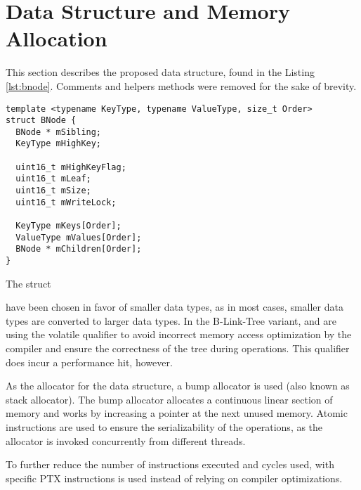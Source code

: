 \section{Data Structure and Memory Allocation}

This section describes the proposed data structure, found in the Listing \ref{lst:bnode}. Comments and helpers methods were removed for the sake of brevity.

\begin{listing}[H]
  \begin{verbatim}
template <typename KeyType, typename ValueType, size_t Order>
struct BNode {
  BNode * mSibling;
  KeyType mHighKey;

  uint16_t mHighKeyFlag;
  uint16_t mLeaf;
  uint16_t mSize;
  uint16_t mWriteLock;

  KeyType mKeys[Order];
  ValueType mValues[Order];
  BNode * mChildren[Order]; 
}
    \end{verbatim}
  \caption{The  struct}\label{lst:bnode}
\end{listing}

 have been chosen in favor of smaller data types, as in most cases, smaller data types are converted to larger data types. In the B-Link-Tree variant,  and  are using the volatile qualifier to avoid incorrect memory access optimization by the compiler and ensure the correctness of the tree during operations. This qualifier does incur a performance hit, however.

As the allocator for the data structure, a bump allocator is used (also known as stack allocator). The bump allocator allocates a continuous linear section of memory and works by increasing a pointer at the next unused memory. Atomic instructions are used to ensure the serializability of the operations, as the allocator is invoked concurrently from different threads.

To further reduce the number of instructions executed and cycles used,  with specific PTX instructions is used instead of relying on compiler optimizations.